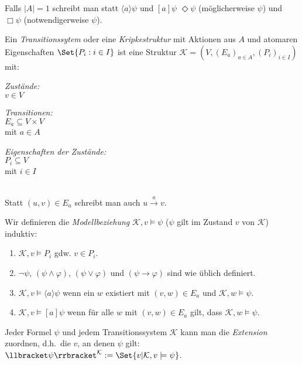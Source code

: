 \documentclass{panikzettel}
\DeclarePairedDelimiter\interpret{\llbracket}{\rrbracket}
\newcommand{\K}{\mathcal{K}}
\begin{document}
Falls $|A| = 1$ schreibt man statt $\langle a \rangle \psi$ und $[a] \psi$ $\Diamond \psi$ (\glqq möglicherweise $\psi$\grqq) und $\Box \psi$ (\glqq notwendigerweise $\psi$\grqq).

Ein \emph{Transitionssytem} oder eine \emph{Kripkestruktur} mit Aktionen aus $A$ und atomaren Eigenschaften $\Set{P_i : i \in I}$ ist eine Struktur $\K = (V,(E_a)_{a \in A},(P_i)_{i \in I})$ mit:

\begin{minipage}[t]{0.3\textwidth}
\begin{center}
\emph{Zustände:} \\
$v \in V$
\end{center}
\end{minipage}
\begin{minipage}[t]{0.35\textwidth}
\begin{center}
\emph{Transitionen:} \\
$E_a \subseteq V \times V$ \\
mit $a \in A$
\end{center}
\end{minipage}
\begin{minipage}[t]{0.35\textwidth}
\begin{center}
\emph{Eigenschaften der Zustände:} \\
$P_i \subseteq V$ \\
mit $i \in I$
\end{center}
\end{minipage}
\ \\

Statt $(u,v) \in E_a$ schreibt man auch $u \overset{a}{\to} v$.

Wir definieren die \emph{Modellbeziehung} $\K,v \models \psi$ ($\psi$ gilt im Zustand $v$ von $\K$) induktiv:
\begin{enumerate}
\item $\K,v \models P_i$ gdw. $v \in P_i$.
\item $\neg \psi$, $(\psi \land \varphi)$, $(\psi \lor \varphi)$ und $(\psi \to \varphi)$ sind wie üblich definiert.
\item $\K,v \models \langle a \rangle \psi $ wenn ein $w$ existiert mit $(v,w) \in E_a$ und $\K,w \models \psi $.
\item $\K,v \models [a] \psi $ wenn für alle $w$ mit $(v,w) \in E_a$ gilt, dass $\K,w \models \psi $.
\end{enumerate}

Jeder Formel $\psi$ und jedem Transitionssystem $\K$ kann man die \emph{Extension} zuordnen, d.h.\ die $v$, an denen $\psi$ gilt: $\interpret{\psi}^\K := \Set{v | \K, v \models \psi}$.
\end{document}
